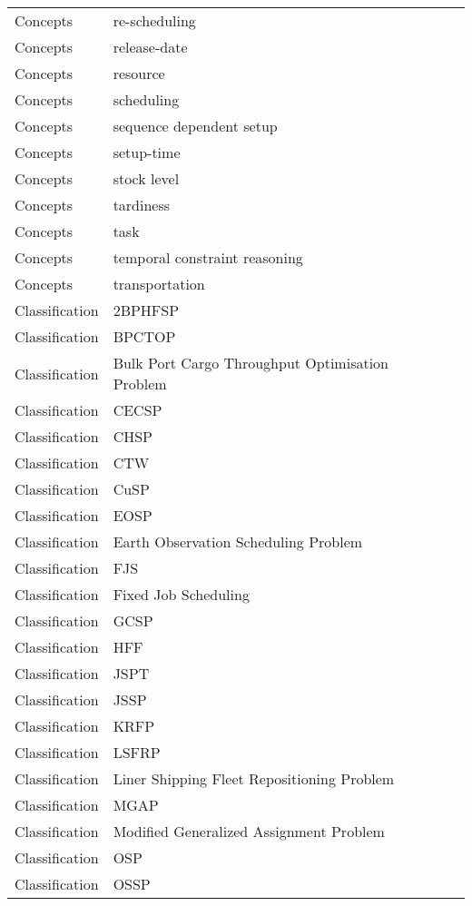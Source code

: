 {\begin{longtable}{lp{3cm}>{\raggedright}p{6cm}>{\raggedright}p{6cm}p{8cm}}
Concepts & re-scheduling &  &  & \\
Concepts & release-date &  &  & \\
Concepts & resource &  &  & \\
Concepts & scheduling &  &  & \\
Concepts & sequence dependent setup &  &  & \\
Concepts & setup-time &  &  & \\
Concepts & stock level &  &  & \\
Concepts & tardiness &  &  & \\
Concepts & task &  &  & \\
Concepts & temporal constraint reasoning &  &  & \\
Concepts & transportation &  &  & \\
Classification & 2BPHFSP &  &  & \\
Classification & BPCTOP &  &  & \\
Classification & Bulk Port Cargo Throughput Optimisation Problem &  &  & \\
Classification & CECSP &  &  & \\
Classification & CHSP &  &  & \\
Classification & CTW &  &  & \\
Classification & CuSP &  &  & \\
Classification & EOSP &  &  & \\
Classification & Earth Observation Scheduling Problem &  &  & \\
Classification & FJS &  &  & \\
Classification & Fixed Job Scheduling &  &  & \\
Classification & GCSP &  &  & \\
Classification & HFF &  &  & \\
Classification & JSPT &  &  & \\
Classification & JSSP &  &  & \\
Classification & KRFP &  &  & \\
Classification & LSFRP &  &  & \\
Classification & Liner Shipping Fleet Repositioning Problem &  &  & \\
Classification & MGAP &  &  & \\
Classification & Modified Generalized Assignment Problem &  &  & \\
Classification & OSP &  &  & \\
Classification & OSSP &  &  & \\

\end{longtable}}
